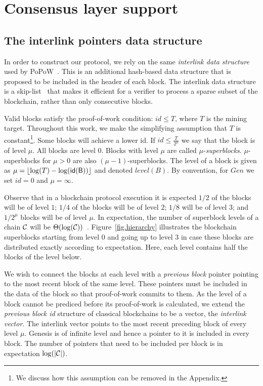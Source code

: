 \section{Consensus layer support} \label{sec.consensus}

\subsection{The interlink pointers data structure}
\label{sec.interlink}

In order to construct our protocol, we rely on the same \emph{interlink data
structure} used by PoPoW~\cite{KLS}. This is an additional hash-based data
structure that is proposed to be included in the header of each block. The
interlink data structure is a skip-list~\cite{skiplist} that makes it efficient
for a verifier to process a sparse subset of the blockchain, rather than only
consecutive blocks.

Valid blocks satisfy the proof-of-work condition: $id \leq T$, where $T$ is the
mining target. Throughout this work, we make the simplifying assumption that $T$
is constant\footnote{We discuss how this assumption can be removed in the
Appendix.}. Some blocks will achieve a lower id. If $id \leq \frac{T}{2^\mu}$ we
say that the block is of level $\mu$. All blocks are level $0$. Blocks with
level $\mu$ are called $\mu$-\textit{superblocks}. $\mu$-superblocks for $\mu >
0$ are also $(\mu - 1)$-superblocks. The level of a block is given as $\mu =
\left \lfloor \log(T) - \log(\sf{id}(B)) \right \rfloor$ and denoted
$\textit{level}(B)$. By convention, for $Gen$ we set $id = 0$ and $\mu =
\infty$.

Observe that in a blockchain protocol execution it is expected $1/2$ of the
blocks will be of level $1$; $1/4$ of the blocks will be of level $2$; $1/8$
will be of level $3$; and $1/2^\mu$ blocks will be of level $\mu$. In
expectation, the number of superblock levels of a chain $\mathcal{C}$ will be
$\Theta(\log(\mathcal{C}))$~\cite{KLS}. Figure~\ref{fig.hierarchy} illustrates the
blockchain superblocks starting from level $0$ and going up to level $3$ in case
these blocks are distributed exactly according to expectation. Here, each level
contains half the blocks of the level below.

We wish to connect the blocks at each level with a \emph{previous block}
pointer pointing to the most recent block of the same level. These pointers must
be included in the data of the block so that proof-of-work commits to them. As
the level of a block cannot be prediced before its proof-of-work is calculated,
we extend the \emph{previous block id} structure of classical blockchains to be
a vector, the \emph{interlink vector}. The interlink vector points to the most
recent preceding block of every level $\mu$. Genesis is of infinite level and
hence a pointer to it is included in every block. The number of pointers that
need to be included per block is in expectation $\log(|\mathcal{C}|)$.

